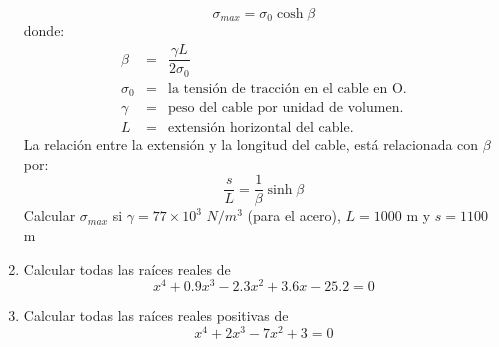 \documentclass[11pt]{article}
\begin{document}
\begin{enumerate}
\[ \sigma_{max} = \sigma_{0} \cosh \beta \]
donde:
\begin{eqnarray*}
\beta &=& \dfrac{\gamma L}{2 \sigma_{0}} \\
\sigma_{0} &=& \mbox{la tensi\'{o}n de tracci\'{o}n en el cable en O.} \\
\gamma &=& \mbox{peso del cable por unidad de volumen.} \\
L &=& \mbox{extensi\'{o}n horizontal del cable.} 
\end{eqnarray*}
La relaci\'{o}n entre la extensi\'{o}n y la longitud del cable, est\'{a} relacionada con $\beta$ por:
\[ \dfrac{s}{L} = \dfrac{1}{\beta} \sinh \beta\]
Calcular $\sigma_{max}$ si $\gamma = 77 \times 10^{3}$ $N/m^{3}$ (para el acero), $L=1000$ m y $s=1100$ m
\item Calcular todas las ra\'{i}ces reales de
\[ x^{4} + 0.9 x^{3} -2.3 x^{2} + 3.6 x - 25.2 = 0\]
\item Calcular todas las ra\'{i}ces reales positivas de
\[ x^{4} + 2x^{3} - 7x^{2} + 3 = 0\]
\end{enumerate}
\end{document}
